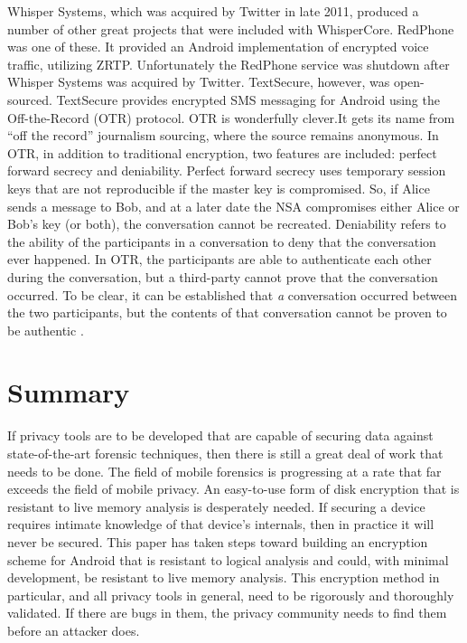 Whisper Systems, which was acquired by Twitter in late 2011, produced a number of other great projects that were included with
WhisperCore. RedPhone was one of these. It provided an Android implementation of encrypted voice traffic, utilizing ZRTP.
Unfortunately the RedPhone service was shutdown after Whisper Systems was acquired by Twitter. TextSecure, however, was
open-sourced. TextSecure provides encrypted SMS messaging for Android using the Off-the-Record (OTR) protocol. OTR is wonderfully
clever.It gets its name from ``off the record'' journalism sourcing, where the source remains anonymous. In OTR, in addition to
traditional encryption, two features are included: perfect forward secrecy and deniability. Perfect forward secrecy uses
temporary session keys that are not reproducible if the master key is compromised. So, if Alice sends a message to Bob, and at a
later date the NSA compromises either Alice or Bob's key (or both), the conversation cannot be recreated.  Deniability refers to the
ability of the participants in a conversation to deny that the conversation ever happened. In OTR, the participants are able to
authenticate each other during the conversation, but a third-party cannot prove that the conversation occurred. To be clear, it can
be established that \emph{a} conversation occurred between the two participants, but the contents of that conversation cannot be
proven to be authentic \cite{otr}.


\section{Summary}

If privacy tools are to be developed that are capable of securing data against state-of-the-art forensic techniques, then there is
still a great deal of work that needs to be done. The field of mobile forensics is progressing at a rate that far exceeds the
field of mobile privacy. An easy-to-use form of disk encryption that is resistant to live memory analysis is desperately needed.  If
securing a device requires intimate knowledge of that device's internals, then in practice it will never be secured. This paper has
taken steps toward building an encryption scheme for Android that is resistant to logical analysis and could, with minimal
development, be resistant to live memory analysis. This encryption method in particular, and all privacy tools in general, need to
be rigorously and thoroughly validated. If there are bugs in them, the privacy community needs to find them before an attacker does.
